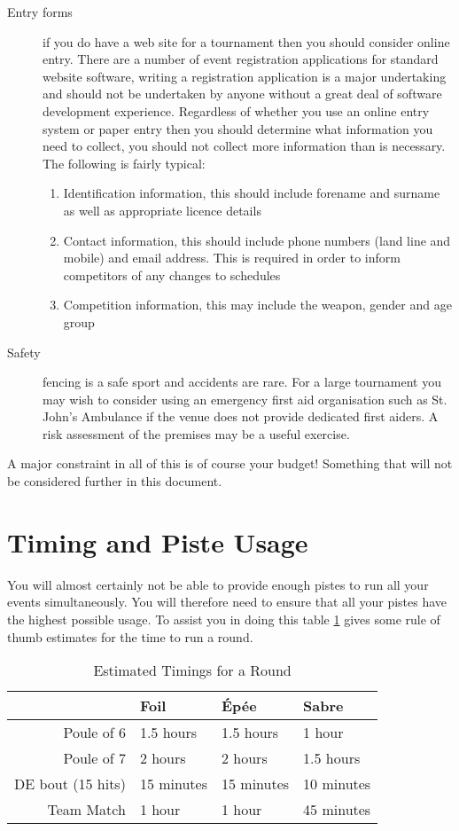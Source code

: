 \documentclass[a4paper,11pt]{memoir}
\begin{document}
\begin{description}
 \item[Entry forms] if you do have a web site for a tournament then you should consider online entry. There are a number of event registration applications for standard website software, writing a registration application is a major undertaking and should not be undertaken by anyone without a great deal of software development experience. Regardless of whether you use an online entry system or paper entry then you should determine what information you need to collect, you should not collect more information than is necessary. The following is fairly typical:
 \begin{enumerate}
  \item Identification information, this should include forename and surname as well as appropriate licence details
  \item Contact information, this should include phone numbers (land line and mobile) and email address. This is required in order to inform competitors of any changes to schedules
  \item Competition information, this may include the weapon, gender and age group
 \end{enumerate}
 \item[Safety] fencing is a safe sport and accidents are rare. For a large tournament you may wish to consider using an emergency first aid organisation such as St. John's Ambulance if the venue does not provide dedicated first aiders. A risk assessment of the premises may be a useful exercise.
\end{description}

A major constraint in all of this is of course your budget!  Something that will not be considered further in this document.

\section{Timing and Piste Usage}
You will almost certainly not be able to provide enough pistes to run all your events simultaneously.  You will therefore need to ensure that all your pistes have the highest possible usage.  To assist you in doing this table \ref{tab:05-estimatedTimings} gives some rule of thumb estimates for the time to run a \gls{round}.

\begin{table}[!ht]
 \centering
 \begin{tabular}{rlll}
  \toprule
  & Foil & \'{E}p\'{e}e & Sabre \\
  \midrule
  Poule of 6 & 1.5 hours & 1.5 hours & 1 hour \\
  Poule of 7 & 2 hours & 2 hours & 1.5 hours \\
  DE bout (15 hits) & 15 minutes & 15 minutes & 10 minutes \\
  Team Match & 1 hour & 1 hour & 45 minutes \\
  \bottomrule
 \end{tabular}
 \caption{Estimated Timings for a Round} \label{tab:05-estimatedTimings}
\end{table}
\end{document}
